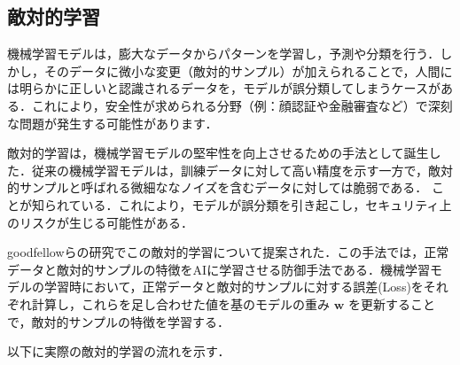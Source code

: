 
\subsection{敵対的学習}
機械学習モデルは，膨大なデータからパターンを学習し，予測や分類を行う．しかし，そのデータに微小な変更（敵対的サンプル）が加えられることで，人間には明らかに正しいと認識されるデータを，モデルが誤分類してしまうケースがある．これにより，安全性が求められる分野（例：顔認証や金融審査など）で深刻な問題が発生する可能性があります．

敵対的学習は，機械学習モデルの堅牢性を向上させるための手法として誕生した．従来の機械学習モデルは，訓練データに対して高い精度を示す一方で，敵対的サンプルと呼ばれる微細ななノイズを含むデータに対しては脆弱である．
ことが知られている．これにより，モデルが誤分類を引き起こし，セキュリティ上のリスクが生じる可能性がある．

goodfellowらの研究\cite{goodfellow2015explaining}でこの敵対的学習について提案された．この手法では，正常データと敵対的サンプルの特徴をAIに学習させる防御手法である．機械学習モデルの学習時において，正常データと敵対的サンプルに対する誤差(Loss)をそれぞれ計算し，これらを足し合わせた値を基のモデルの重み $\bm{w}$ を更新することで，敵対的サンプルの特徴を学習する．

以下に実際の敵対的学習の流れを示す．\cite{MBSD-AdversarialTraining}

